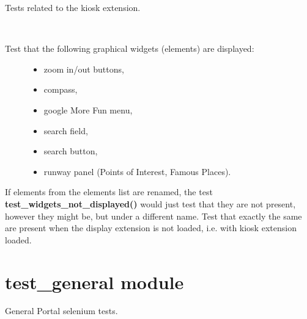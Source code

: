 \documentclass[letterpaper,10pt,english]{sphinxmanual}
\begin{document}
\begin{fulllineitems}
\label{test_display_kiosk:test_display_kiosk.TestBaseKioskExtension}
Tests related to the kiosk extension.

\begin{fulllineitems}
\label{test_display_kiosk:test_display_kiosk.TestBaseKioskExtension.test_widgets_displayed}~\begin{description}
\item[{Test that the following graphical widgets (elements) are displayed:}] \leavevmode\begin{itemize}
\item {} 
zoom in/out buttons,

\item {} 
compass,

\item {} 
google More Fun menu,

\item {} 
search field,

\item {} 
search button,

\item {} 
runway panel (Points of Interest, Famous Places).

\end{itemize}

\end{description}

If elements from the elements list are renamed, the test
\textbf{test\_widgets\_not\_displayed()} would just test that they are not present,
however they might be, but under a different name.
Test that exactly the same are present when the display
extension is not loaded, i.e. with kiosk extension loaded.

\end{fulllineitems}


\end{fulllineitems}



\section{test\_general module}
\label{test_general:test-general-module}\label{test_general::doc}\label{test_general:module-test_general}
General Portal selenium tests.
\end{document}
